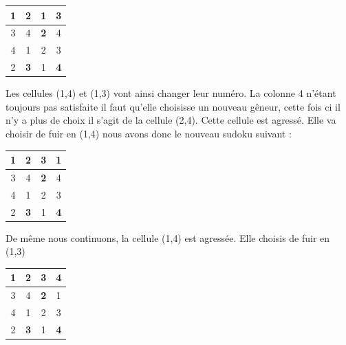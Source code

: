	\begin{center}
         \begin{tabular}{|c|c| |c|c| }
               \hline
               \textbf{1}&2&{\color{green} 1}&{\color{red} 3}\\
               \hline
               3&4&\textbf{2}&4\\
               \hline
               \hline
               4&1&2&3\\
               \hline
               2&\textbf{3}&1&\textbf{4}\\                      
            \hline
        \end{tabular}
    \end{center}
    
    Les cellules (1,4) et (1,3) vont ainsi changer leur numéro. La colonne 4 n'étant toujours pas satisfaite il faut qu'elle choisisse un nouveau gêneur, cette fois ci il n'y a plus de choix il s'agit de la cellule (2,4). Cette cellule est agressé. Elle va choisir de fuir en (1,4) nous avons donc le nouveau sudoku suivant : \\
    \begin{center}
         \begin{tabular}{|c|c| |c|c| }
               \hline
               \textbf{1}&2& 3&{\color{green} 1}\\
               \hline
               3&4&\textbf{2}&{\color{red} 4}\\
               \hline
               \hline
               4&1&2&3\\
               \hline
               2&\textbf{3}&1&\textbf{4}\\                      
            \hline
        \end{tabular}
    \end{center}

    De même nous continuons, la cellule (1,4) est agressée. Elle choisis de fuir en (1,3) \\
	\begin{center}
         \begin{tabular}{|c|c| |c|c| }
               \hline
               \textbf{1}&2&{\color{green} 3}&{\color{red} 4}\\
               \hline
               3&4&\textbf{2}&1\\
               \hline
               \hline
               4&1&2&3\\
               \hline
               2&\textbf{3}&1&\textbf{4}\\                      
            \hline
        \end{tabular}
    \end{center}
    
